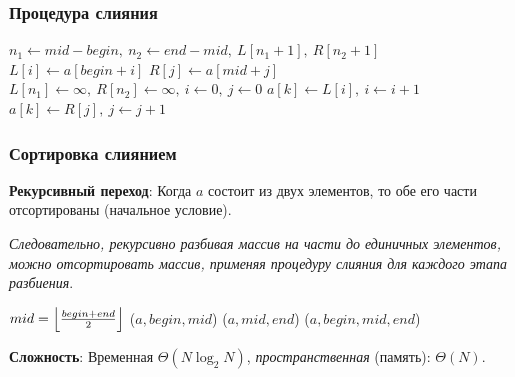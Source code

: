 \documentclass{beamer}
\DeclarePairedDelimiter\floor{\lfloor}{\rfloor}
\begin{document}
    \begin{frame}[fragile]
        \frametitle{Процедура слияния}
        \begin{algorithm}[H]
            \DontPrintSemicolon

            {
                $n_{1} \leftarrow mid - begin,\ n_{2} \leftarrow end - mid,\ L[n_{1} + 1],\ R[n_{2} + 1]$\;
                {
                    $L[i] \leftarrow a[begin + i]$\;
                }
                {
                    $R[j] \leftarrow a[mid + j]$\;
                }
                $L[n_{1}] \leftarrow \infty,\ R[n_{2}] \leftarrow \infty,\ i \leftarrow 0,\ j \leftarrow 0$\;
                {
                    {
                        $a[k] \leftarrow L[i],\ i \leftarrow i + 1$\;
                    }
                    {
                        $a[k] \leftarrow R[j],\ j \leftarrow j + 1$\;
                    }
                }
            }
        \end{algorithm}
    \end{frame}
    \begin{frame}[fragile]
        \frametitle{Сортировка слиянием}
        \justifying
        {\bf Рекурсивный переход}: Когда $a$ состоит из двух элементов, то обе его части отсортированы (начальное условие).
        \par
        {\it Следовательно, рекурсивно разбивая массив на части до единичных элементов, можно отсортировать массив, применяя процедуру слияния для каждого этапа разбиения}.
        \par
        \vspace{0.5cm}
        \begin{algorithm}[H]
            \DontPrintSemicolon

            {
                {
                    $mid = \floor*{\frac{begin + end}{2}}$\; 
                    \FMergeSort($a, begin, mid$)\;
                    \FMergeSort($a, mid, end$)\;
                    \FMerge($a, begin, mid, end$)\;
                }
            }
        \end{algorithm}
        \par
        \vspace{0.2cm}
        \justifying
        {\bf Сложность}: Временная $\Theta(N \log_{2}{N})$, {\it пространственная} (память): $\Theta(N)$.
    \end{frame}
\end{document}
